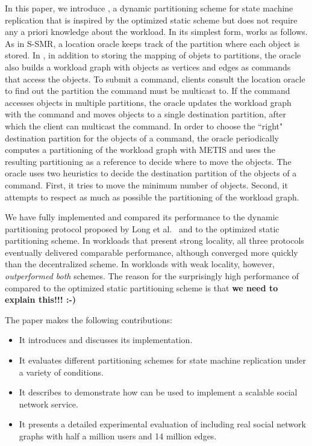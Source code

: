 In this paper, we introduce \dynastar, a dynamic partitioning scheme for state machine replication that is inspired by the optimized static scheme but does not require any a priori knowledge about the workload.
%
In its simplest form, \dynastar works as follows.
As in S-SMR, a location oracle keeps track of the partition where each object is stored.
In \dynastar, in addition to storing the mapping of objets to partitions, the oracle also builds a workload graph with objects as vertices and edges as commands that access the objects. 
To submit a command, clients consult the location oracle to find out the partition the command must be multicast to.
If the command accesses objects in multiple partitions, the oracle updates the workload graph with the command and moves objects to a single destination partition, after which the client can multicast the command.
In order to choose the ``right" destination partition for the objects of a command, the oracle periodically computes a partitioning of the workload graph with METIS and uses the resulting partitioning as a reference to decide where to move the objects.
The oracle uses two heuristics to decide the destination partition of the objects of a command.
First, it tries to move the minimum number of objects.
Second, it attempts to respect as much as possible the partitioning of the workload graph.

We have fully implemented \dynastar and compared its performance to the dynamic partitioning protocol proposed by Long et al.~\cite{hoang2016} and to the optimized static partitioning scheme.
In workloads that present strong locality, all three protocols eventually delivered comparable performance, although \dynastar converged more quickly than the decentralized scheme.
In workloads with weak locality, however, \dynastar \emph{outperformed both} schemes.
The reason for the surprisingly high performance of \dynastar compared to the optimized static partitioning scheme is that \textbf{we need to explain this!!! :-)}

The paper makes the following contributions:
\begin{itemize}
\item It introduces \dynastar and discusses its implementation. 
\item It evaluates different partitioning schemes for state machine replication under a variety of conditions.
\item It describes \appname{} to demonstrate how \libname{} can be used to implement a scalable social network service.
\item It presents a detailed experimental evaluation of \dynastar including real social network graphs with half a million users and 14 million edges.
\end{itemize}

